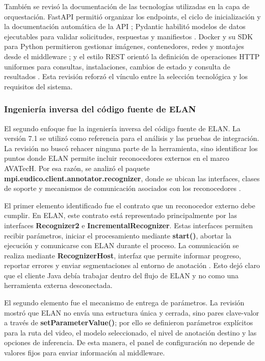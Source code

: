 También se revisó la documentación de las tecnologías utilizadas en la capa de orquestación. FastAPI permitió organizar los endpoints, el ciclo de inicialización y la documentación automática de la API \cite{fastapi2026features}; Pydantic habilitó modelos de datos ejecutables para validar solicitudes, respuestas y manifiestos \cite{pydantic2026models}. Docker y su SDK para Python permitieron gestionar imágenes, contenedores, redes y montajes desde el middleware \cite{docker2026overview,docker_sdk_python}; y el estilo REST orientó la definición de operaciones HTTP uniformes para consultas, instalaciones, cambios de estado y consulta de resultados \cite{fielding2000rest}. Esta revisión reforzó el vínculo entre la selección tecnológica y los requisitos del sistema.

\subsubsection{Ingeniería inversa del código fuente de ELAN}

El segundo enfoque fue la ingeniería inversa del código fuente de ELAN. La versión 7.1 se utilizó como referencia para el análisis y las pruebas de integración. La revisión no buscó rehacer ninguna parte de la herramienta, sino identificar los puntos donde ELAN permite incluir reconocedores externos en el marco AVATecH. Por esa razón, se analizó el paquete \textbf{mpi.eudico.client.annotator.recognizer}, donde se ubican las interfaces, clases de soporte y mecanismos de comunicación asociados con los reconocedores \cite{auer2010elan,auer2014avatech}.

El primer elemento identificado fue el contrato que un reconocedor externo debe cumplir. En ELAN, este contrato está representado principalmente por las interfaces \textbf{Recognizer2} e \textbf{IncrementalRecognizer}. Estas interfaces permiten recibir parámetros, iniciar el procesamiento mediante \textbf{start()}, abortar la ejecución y comunicarse con ELAN durante el proceso. La comunicación se realiza mediante \textbf{RecognizerHost}, interfaz que permite informar progreso, reportar errores y enviar segmentaciones al entorno de anotación \cite{auer2014avatech}. Esto dejó claro que el cliente Java debía trabajar dentro del flujo de ELAN y no como una herramienta externa desconectada.

El segundo elemento fue el mecanismo de entrega de parámetros. La revisión mostró que ELAN no envía una estructura única y cerrada, sino pares clave-valor a través de \textbf{setParameterValue()}; por ello se definieron parámetros explícitos para la ruta del video, el modelo seleccionado, el nivel de anotación destino y las opciones de inferencia. De esta manera, el panel de configuración no depende de valores fijos para enviar información al middleware.

